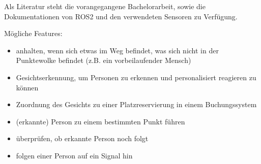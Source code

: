 Als Literatur steht die vorangegangene Bachelorarbeit, sowie die Dokumentationen von ROS2 und den verwendeten Sensoren zu Verfügung.

Mögliche Features:
\begin{itemize}
    \item anhalten, wenn sich etwas im Weg befindet,
          was sich nicht in der Punktewolke befindet (z.B. ein vorbeilaufender Mensch)
    \item Gesichtserkennung, um Personen zu erkennen und personalisiert reagieren zu können
    \item Zuordnung des Gesichts zu einer Platzreservierung in einem Buchungssystem
    \item (erkannte) Person zu einem bestimmten Punkt führen
    \item überprüfen, ob erkannte Person noch folgt
    \item folgen einer Person auf ein Signal hin
\end{itemize}